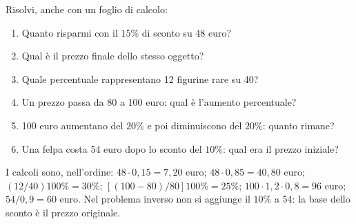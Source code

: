 
\begin{esercizio}
Risolvi, anche con un foglio di calcolo:
\begin{enumerate}
\item Quanto risparmi con il $15\%$ di sconto su 48 euro?
\item Qual è il prezzo finale dello stesso oggetto?
\item Quale percentuale rappresentano 12 figurine rare su 40?
\item Un prezzo passa da 80 a 100 euro: qual è l'aumento percentuale?
\item 100 euro aumentano del $20\%$ e poi diminuiscono del $20\%$: quanto rimane?
\item Una felpa costa 54 euro dopo lo sconto del $10\%$: qual era il prezzo iniziale?
\end{enumerate}
\end{esercizio}

\begin{soluzione}
I calcoli sono, nell'ordine: $48\cdot0{,}15=7{,}20$ euro;
$48\cdot0{,}85=40{,}80$ euro; $(12/40)100\%=30\%$;
$[(100-80)/80]100\%=25\%$; $100\cdot1{,}2\cdot0{,}8=96$ euro;
$54/0{,}9=60$ euro. Nel problema inverso non si aggiunge il $10\%$ a 54:
la base dello sconto è il prezzo originale.
\end{soluzione}
